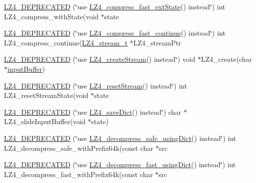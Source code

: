\begin{DoxyCompactItemize}
\item 
\hyperlink{compat-lz4_8h_a3788b2a02fe98ad874485600fde9caa3}{L\+Z4\+\_\+\+D\+E\+P\+R\+E\+C\+A\+T\+E\+D} (\char`\"{}use \hyperlink{compat-lz4_8h_adf10cb9dd113049e97bdc3ee5ce7b6ed}{L\+Z4\+\_\+compress\+\_\+fast\+\_\+ext\+State}() instead\char`\"{}) int L\+Z4\+\_\+compress\+\_\+with\+State(void $\ast$state
\item 
\hyperlink{compat-lz4_8h_abaf1151811a93dba725fdf2ecf8abf0a}{L\+Z4\+\_\+\+D\+E\+P\+R\+E\+C\+A\+T\+E\+D} (\char`\"{}use \hyperlink{compat-lz4_8h_a7c280948702564f0620262a8eb0b6436}{L\+Z4\+\_\+compress\+\_\+fast\+\_\+continue}() instead\char`\"{}) int L\+Z4\+\_\+compress\+\_\+continue(\hyperlink{compat-lz4_8h_a4fb9ac4ce6d5e25edc9188f9d6633498}{L\+Z4\+\_\+stream\+\_\+t} $\ast$L\+Z4\+\_\+stream\+Ptr
\item 
\hyperlink{compat-lz4_8h_af4492c6b2a6f4c275c044e2d292e2900}{L\+Z4\+\_\+\+D\+E\+P\+R\+E\+C\+A\+T\+E\+D} (\char`\"{}use \hyperlink{compat-lz4_8h_ae2f3cdde265f5abde4c1299bcdfbe5b8}{L\+Z4\+\_\+create\+Stream}() instead\char`\"{}) void $\ast$L\+Z4\+\_\+create(char $\ast$\hyperlink{compat-lz4_8h_a74538761f55cd8dbed4b6e62ce69876d}{input\+Buffer})
\item 
\hyperlink{compat-lz4_8h_a4fcd58d09cd54cae0310a362eb7f8fde}{L\+Z4\+\_\+\+D\+E\+P\+R\+E\+C\+A\+T\+E\+D} (\char`\"{}use \hyperlink{compat-lz4_8h_ac8d5c49bc84243e6b69df1ecc25d2425}{L\+Z4\+\_\+reset\+Stream}() instead\char`\"{}) int L\+Z4\+\_\+reset\+Stream\+State(void $\ast$state
\item 
\hyperlink{compat-lz4_8h_a548d68fc3c6e57da77cc5b965a197a69}{L\+Z4\+\_\+\+D\+E\+P\+R\+E\+C\+A\+T\+E\+D} (\char`\"{}use \hyperlink{compat-lz4_8h_aee9e5bb8a837d840e120f666ed07c09b}{L\+Z4\+\_\+save\+Dict}() instead\char`\"{}) char $\ast$L\+Z4\+\_\+slide\+Input\+Buffer(void $\ast$state)
\item 
\hyperlink{compat-lz4_8h_a223091252715f6a90b84ed7aada75b4c}{L\+Z4\+\_\+\+D\+E\+P\+R\+E\+C\+A\+T\+E\+D} (\char`\"{}use \hyperlink{compat-lz4_8h_a6f859dbaf83e1e76440ba34fa3c80b75}{L\+Z4\+\_\+decompress\+\_\+safe\+\_\+using\+Dict}() instead\char`\"{}) int L\+Z4\+\_\+decompress\+\_\+safe\+\_\+with\+Prefix64k(const char $\ast$src
\item 
\hyperlink{compat-lz4_8h_a263e18c96be5caf1eb7758a7bbc3c5a8}{L\+Z4\+\_\+\+D\+E\+P\+R\+E\+C\+A\+T\+E\+D} (\char`\"{}use \hyperlink{compat-lz4_8h_a7f3f35d47e1873d6d29a0d8a1d0a9aa4}{L\+Z4\+\_\+decompress\+\_\+fast\+\_\+using\+Dict}() instead\char`\"{}) int L\+Z4\+\_\+decompress\+\_\+fast\+\_\+with\+Prefix64k(const char $\ast$src
\end{DoxyCompactItemize}
